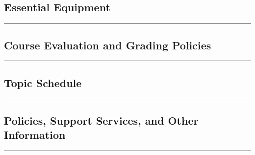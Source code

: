 \documentclass[11pt]{handout}
\begin{document}
 
  \subsection*{Essential Equipment}
  
  \vspace{2ex}\hrule\vspace{2ex}

   
  \subsection*{Course Evaluation and Grading Policies} 
  
  \vspace{2ex}\hrule\vspace{2ex}


\if{}
{
  \subsection*{Topic Schedule}
  
  \vspace{2ex}\hrule\vspace{2ex}
}
\fi


\if{}
{
  \subsection*{Policies, Support Services, and Other Information}
  
  \vspace{2ex}\hrule\vspace{2ex}
}
\fi
 
\end{document}
